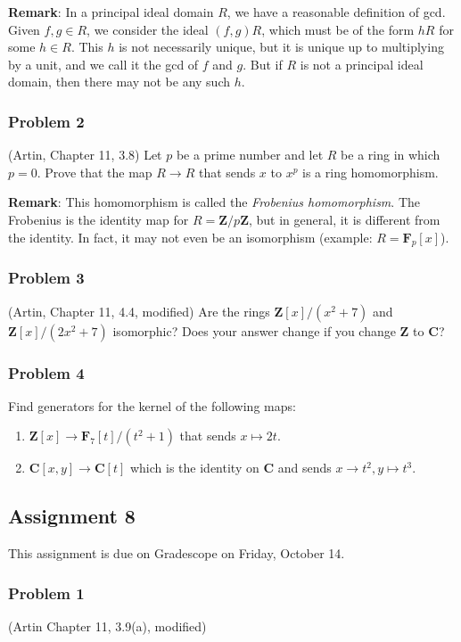 \documentclass[11pt]{article}
\begin{document}
\textbf{Remark}: In a principal ideal domain \(R\), we have a reasonable definition of gcd.
Given \(f, g \in R\), we consider the ideal \((f,g)R\), which must be of the form \(hR\) for some \(h \in R\). This \(h\) is not necessarily unique, but it is unique up to multiplying by a unit, and we call it the gcd of \(f\) and \(g\).
But if \(R\) is not a principal ideal domain, then there may not be any such \(h\).
\subsubsection*{Problem 2}
\label{sec:org5761b35}
(Artin, Chapter 11, 3.8)
Let \(p\) be a prime number and let \(R\) be a ring in which \(p = 0\).
Prove that the map \(R \to R\) that sends \(x\) to \(x^p\) is a ring homomorphism.

\textbf{Remark}:  This homomorphism is called the \emph{Frobenius homomorphism}.  The Frobenius is the identity map for \(R = \mathbf{Z}/p \mathbf{Z}\), but in general, it is different from the identity.  In fact, it may not even be an isomorphism (example: \(R = \mathbf{F}_p[x]\)).

\subsubsection*{Problem 3}
\label{sec:orgd0e78a0}
(Artin, Chapter 11, 4.4, modified)
Are the rings \(\mathbf{Z}[x]/(x^2+7)\) and \(\mathbf{Z}[x]/(2x^2+7)\) isomorphic?
Does your answer change if you change \(\mathbf{Z}\) to \(\mathbf{C}\)?

\subsubsection*{Problem 4}
\label{sec:org4474c32}
Find generators for the kernel of the following maps:
\begin{enumerate}
\item \(\mathbf{Z}[x] \to \mathbf{F}_7[t]/(t^2+1)\) that sends \(x \mapsto 2t\).
\item \(\mathbf{C}[x,y] \to \mathbf{C}[t]\) which is the identity on \(\mathbf{C}\) and sends \(x \to t^2, y \mapsto t^3\).
\end{enumerate}

\subsection*{Assignment 8}
\label{sec:orgc50d60c}
This assignment is due on Gradescope on Friday, October 14.
\subsubsection*{Problem 1}
\label{sec:org90c080e}
(Artin Chapter 11, 3.9(a), modified)
\end{document}
